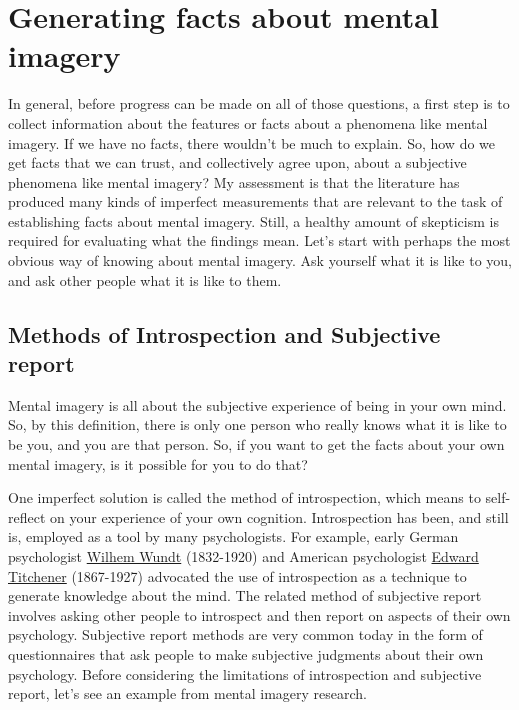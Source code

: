 \documentclass[
  oneside,
  12pt]{crumpbook}
\begin{document}
\hypertarget{generating-facts-about-mental-imagery}{%
\section{Generating facts about mental imagery}\label{generating-facts-about-mental-imagery}}

In general, before progress can be made on all of those questions, a first step is to collect information about the features or facts about a phenomena like mental imagery. If we have no facts, there wouldn't be much to explain. So, how do we get facts that we can trust, and collectively agree upon, about a subjective phenomena like mental imagery? My assessment is that the literature has produced many kinds of imperfect measurements that are relevant to the task of establishing facts about mental imagery. Still, a healthy amount of skepticism is required for evaluating what the findings mean. Let's start with perhaps the most obvious way of knowing about mental imagery. Ask yourself what it is like to you, and ask other people what it is like to them.

\hypertarget{methods-of-introspection-and-subjective-report}{%
\subsection{Methods of Introspection and Subjective report}\label{methods-of-introspection-and-subjective-report}}

Mental imagery is all about the subjective experience of being in your own mind. So, by this definition, there is only one person who really knows what it is like to be you, and you are that person. So, if you want to get the facts about your own mental imagery, is it possible for you to do that?

One imperfect solution is called the method of introspection, which means to self-reflect on your experience of your own cognition. Introspection has been, and still is, employed as a tool by many psychologists. For example, early German psychologist \href{https://en.wikipedia.org/wiki/Wilhelm_Wundt}{Wilhem Wundt} (1832-1920) and American psychologist \href{https://en.wikipedia.org/wiki/Edward_B._Titchener}{Edward Titchener} (1867-1927) advocated the use of introspection as a technique to generate knowledge about the mind. The related method of subjective report involves asking other people to introspect and then report on aspects of their own psychology. Subjective report methods are very common today in the form of questionnaires that ask people to make subjective judgments about their own psychology. Before considering the limitations of introspection and subjective report, let's see an example from mental imagery research.
\end{document}
